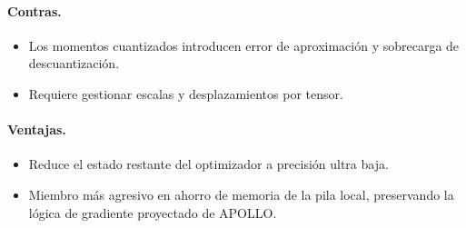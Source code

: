 \paragraph{Contras.}
\begin{itemize}[leftmargin=*]
\item Los momentos cuantizados introducen error de aproximación y sobrecarga de descuantización.
\item Requiere gestionar escalas y desplazamientos por tensor.
\end{itemize}

\paragraph{Ventajas.}
\begin{itemize}[leftmargin=*]
\item Reduce el estado restante del optimizador a precisión ultra baja.
\item Miembro más agresivo en ahorro de memoria de la pila local, preservando la lógica de gradiente proyectado de APOLLO.
\end{itemize}

